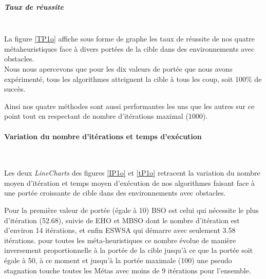 \noindent
\begin{minipage}[t]{0.5\textwidth}
	\subparagraph{Taux de réussite}
	\textbf{}\\
	
	La figure \ref{TP1o} affiche sous forme de graphe les taux de réussite de nos quatre métaheuristiques face à divers portées de la cible dans des environnements avec obstacles.\\
	
	Nous nous apercevons que pour les dix valeurs de portée que nous avons expérimenté, tous les algorithmes atteignent la cible à tous les coup, soit 100\% de succès.
	
	Ainsi nos quatre méthodes sont aussi performantes les uns que les autres sur ce point tout en respectant de nombre d'itérations maximal (1000).
	
\end{minipage}\hfill
\begin{minipage}[t]{0.55\textwidth}
	\captionsetup{width=0.8\linewidth}
	\centering{}
	\label{TP1o}
\end{minipage}\hfill



\noindent
	\paragraph{Variation du nombre d'itérations et temps d'exécution}
	\textbf{ }\\
	
	\vspace{-0.2cm}
	
	Les deux \textit{LineCharts} des figures \ref{IP1o} et \ref{tP1o} retracent la variation du nombre moyen d'itération et temps moyen d'exécution de nos algorithmes faisant face à une portée croissante de cible dans des environnements avec obstacles.\\
	\vspace{-0.2cm}
	
	Pour la première valeur de portée (égale à 10) BSO est celui qui nécessite le plus d'itération (52.68), suivie de  EHO et MBSO dont le nombre d'itération est d'environ 14 itérations, et enfin ESWSA qui démarre avec seulement 3.58 itérations. pour toutes les méta-heuristiques ce nombre évolue de manière inversement proportionnelle à la portée de la cible jusqu'à ce que la portée soit égale à 50, à ce moment et jusqu'à la portée maximale (100) une pseudo stagnation touche toutes les Métas avec moins de 9 itérations pour l'ensemble.\\
		\vspace{-0.2cm}
		

